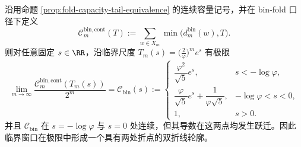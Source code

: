 \begin{theorem}[临界连续容量的精确双折线极限]\label{thm:xi-foldbin-critical-capacity-broken-line}
沿用命题 \ref{prop:fold-capacity-tail-equivalence} 的连续容量记号，并在 bin-fold 口径下定义
\[
\mathcal C_m^{\mathrm{bin,cont}}(T):=\sum_{w\in X_m}\min\!\bigl(d_m^{\mathrm{bin}}(w),T\bigr).
\]
则对任意固定 \(s\in\RR\)，沿临界尺度 \(T_m(s)=\bigl(\tfrac{2}{\varphi}\bigr)^m e^s\) 有极限
\[
\boxed{
\lim_{m\to\infty}\frac{\mathcal C_m^{\mathrm{bin,cont}}(T_m(s))}{2^m}
=
\mathcal C_{\mathrm{bin}}(s):=
\begin{cases}
\dfrac{\varphi^2}{\sqrt5}e^s, & s<-\log\varphi,\\[3mm]
\dfrac{\varphi}{\sqrt5}e^s+\dfrac{1}{\varphi\sqrt5}, & -\log\varphi<s<0,\\[3mm]
1, & s>0.
\end{cases}}
\]
并且 \(\mathcal C_{\mathrm{bin}}\) 在 \(s=-\log\varphi\) 与 \(s=0\) 处连续，但其导数在这两点均发生跃迁。因此临界窗口在极限中形成一个具有两处折点的双折线轮廓。
\end{theorem}
